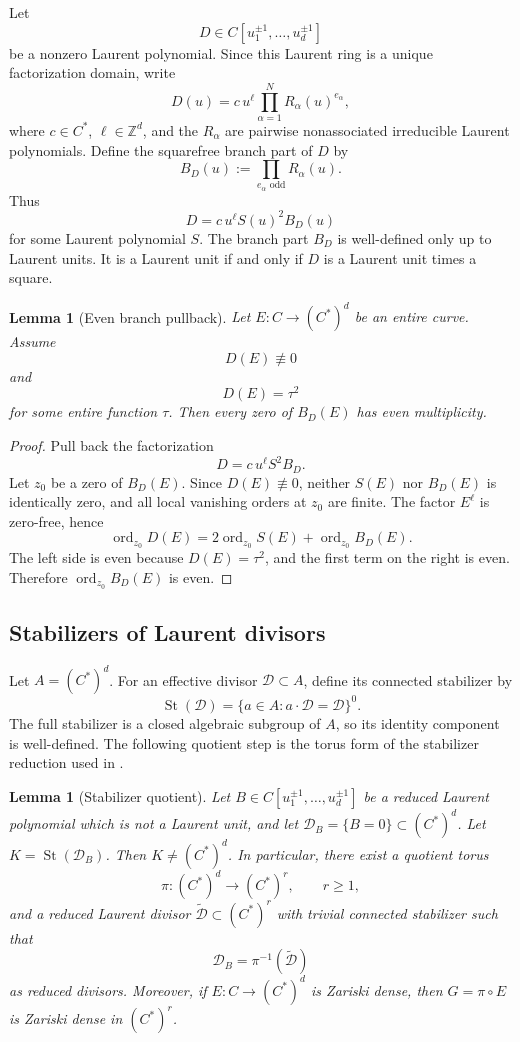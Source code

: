\documentclass[11pt]{amsart}
\def\CC{C}%
\numberwithin{equation}{section}
\newtheorem{lemma}[theorem]{Lemma}
\theoremstyle{definition}
\theoremstyle{remark}
\newcommand{\CC}{\mathbb C}
\newcommand{\ZZ}{\mathbb Z}
\newcommand{\St}{\operatorname{St}}
\newcommand{\ord}{\operatorname{ord}}
\begin{document}
Let
\[
D\in\CC[u_1^{\pm1},\dots,u_d^{\pm1}]
\]
be a nonzero Laurent polynomial. Since this Laurent ring is a unique factorization domain, write
\[
D(u)=c\,u^\ell\prod_{\alpha=1}^NR_\alpha(u)^{e_\alpha},
\]
where $c\in\CC^*$, $\ell\in\ZZ^d$, and the $R_\alpha$ are pairwise nonassociated irreducible Laurent polynomials. Define the squarefree branch part of $D$ by
\[
B_D(u):=\prod_{e_\alpha\text{ odd}}R_\alpha(u).
\]
Thus
\[
D=c\,u^\ell S(u)^2B_D(u)
\]
for some Laurent polynomial $S$. The branch part $B_D$ is well-defined only up to Laurent units. It is a Laurent unit if and only if $D$ is a Laurent unit times a square.

\begin{lemma}[Even branch pullback]\label{lem:even-branch}
Let $E:\CC\to(\CC^*)^d$ be an entire curve. Assume
\[
D(E)\not\equiv0
\]
and
\[
D(E)=\tau^2
\]
for some entire function $\tau$. Then every zero of $B_D(E)$ has even multiplicity.
\end{lemma}

\begin{proof}
Pull back the factorization
\[
D=c\,u^\ell S^2B_D.
\]
Let $z_0$ be a zero of $B_D(E)$.  Since $D(E)\not\equiv0$, neither $S(E)$ nor $B_D(E)$ is identically zero, and all local vanishing orders at $z_0$ are finite.  The factor $E^\ell$ is zero-free, hence
\[
\ord_{z_0}D(E)=2\ord_{z_0}S(E)+\ord_{z_0}B_D(E).
\]
The left side is even because $D(E)=\tau^2$, and the first term on the right is even.  Therefore $\ord_{z_0}B_D(E)$ is even.
\end{proof}

\subsection{Stabilizers of Laurent divisors}

Let $A=(\CC^*)^d$. For an effective divisor $\mathcal D\subset A$, define its connected stabilizer by
\[
\St(\mathcal D)=\{a\in A:a\cdot\mathcal D=\mathcal D\}^0.
\]
The full stabilizer is a closed algebraic subgroup of $A$, so its identity component is well-defined.  The following quotient step is the torus form of the stabilizer reduction used in \cite[Propositions~3.10--3.11]{NoguchiWinkelmannYamanoi2008SMTII}.

\begin{lemma}[Stabilizer quotient]\label{lem:stabilizer-quotient}
Let $B\in\CC[u_1^{\pm1},\dots,u_d^{\pm1}]$ be a reduced Laurent polynomial which is not a Laurent unit, and let $\mathcal D_B=\{B=0\}\subset(\CC^*)^d$. Let $K=\St(\mathcal D_B)$. Then $K\ne(\CC^*)^d$. In particular, there exist a quotient torus
\[
\pi:(\CC^*)^d\to(\CC^*)^r,\qquad r\ge1,
\]
and a reduced Laurent divisor $\widetilde{\mathcal D}\subset(\CC^*)^r$ with trivial connected stabilizer such that
\[
\mathcal D_B=\pi^{-1}(\widetilde{\mathcal D})
\]
as reduced divisors. Moreover, if $E:\CC\to(\CC^*)^d$ is Zariski dense, then
$G=\pi\circ E$ is Zariski dense in $(\CC^*)^r$.
\end{lemma}
\end{document}

